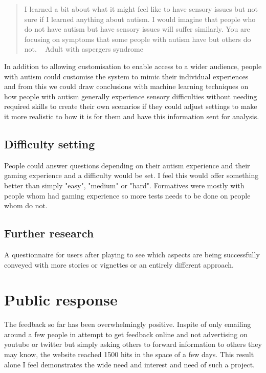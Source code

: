 \begin{quote}
I learned a bit about what it might feel like to have sensory issues but not sure if I learned anything about autism. I would imagine that people who do not have autism but have sensory issues will suffer similarly. You are focusing on symptoms that some people with autism have but others do not. ~ Adult with aspergers syndrome
\end{quote}

In addition to allowing customisation to enable access to a wider audience, people with autism could customise the system to mimic their individual experiences and from this we could draw conclusions with machine learning techniques on how people with autism generally experience sensory difficulties without needing required skills to create their own scenarios if they could adjust settings to make it more realistic to how it is for them and have this information sent for analysis.

\subsection{Difficulty setting}
People could answer questions depending on their autism experience and their gaming experience and a difficulty would be set. I feel this would offer something better than simply "easy", "medium" or "hard". Formatives were mostly with people whom had gaming experience so more tests needs to be done on people whom do not.

\subsection{Further research}
A questionnaire for users after playing to see which aspects are being successfully conveyed with more stories or vignettes or an entirely different approach. 


\section{Public response}
\label{sec:publicresponse}
The feedback so far has been overwhelmingly positive. Inspite of only emailing around a few people in attempt to get feedback online and not advertising on youtube or twitter but simply asking others to forward information to others they may know, the website reached 1500 hits in the space of a few days. This result alone I feel demonstrates the wide need and interest and need of such a project. 

